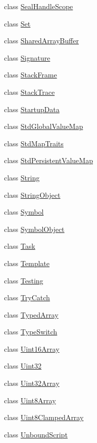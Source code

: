 \begin{DoxyCompactItemize}
\item 
class \hyperlink{classv8_1_1SealHandleScope}{Seal\+Handle\+Scope}
\item 
class \hyperlink{classv8_1_1Set}{Set}
\item 
class \hyperlink{classv8_1_1SharedArrayBuffer}{Shared\+Array\+Buffer}
\item 
class \hyperlink{classv8_1_1Signature}{Signature}
\item 
class \hyperlink{classv8_1_1StackFrame}{Stack\+Frame}
\item 
class \hyperlink{classv8_1_1StackTrace}{Stack\+Trace}
\item 
class \hyperlink{classv8_1_1StartupData}{Startup\+Data}
\item 
class \hyperlink{classv8_1_1StdGlobalValueMap}{Std\+Global\+Value\+Map}
\item 
class \hyperlink{classv8_1_1StdMapTraits}{Std\+Map\+Traits}
\item 
class \hyperlink{classv8_1_1StdPersistentValueMap}{Std\+Persistent\+Value\+Map}
\item 
class \hyperlink{classv8_1_1String}{String}
\item 
class \hyperlink{classv8_1_1StringObject}{String\+Object}
\item 
class \hyperlink{classv8_1_1Symbol}{Symbol}
\item 
class \hyperlink{classv8_1_1SymbolObject}{Symbol\+Object}
\item 
class \hyperlink{classv8_1_1Task}{Task}
\item 
class \hyperlink{classv8_1_1Template}{Template}
\item 
class \hyperlink{classv8_1_1Testing}{Testing}
\item 
class \hyperlink{classv8_1_1TryCatch}{Try\+Catch}
\item 
class \hyperlink{classv8_1_1TypedArray}{Typed\+Array}
\item 
class \hyperlink{classv8_1_1TypeSwitch}{Type\+Switch}
\item 
class \hyperlink{classv8_1_1Uint16Array}{Uint16\+Array}
\item 
class \hyperlink{classv8_1_1Uint32}{Uint32}
\item 
class \hyperlink{classv8_1_1Uint32Array}{Uint32\+Array}
\item 
class \hyperlink{classv8_1_1Uint8Array}{Uint8\+Array}
\item 
class \hyperlink{classv8_1_1Uint8ClampedArray}{Uint8\+Clamped\+Array}
\item 
class \hyperlink{classv8_1_1UnboundScript}{Unbound\+Script}

\end{DoxyCompactItemize}

